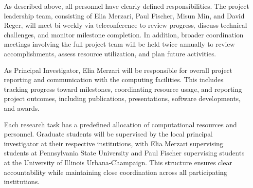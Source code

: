 \documentclass[11pt,letterpaper,english]{article}
\begin{document}
\noindent As described above, all personnel have clearly defined responsibilities. The project leadership team, consisting of Elia Merzari, Paul Fischer, Misun Min, and David Reger, will meet bi-weekly via teleconference to review progress, discuss technical challenges, and monitor milestone completion. In addition, broader coordination meetings involving the full project team will be held twice annually to review accomplishments, assess resource utilization, and plan future activities.

\noindent As Principal Investigator, Elia Merzari will be responsible for overall project reporting and communication with the computing facilities. This includes tracking progress toward milestones, coordinating resource usage, and reporting project outcomes, including publications, presentations, software developments, and awards.

\noindent Each research task has a predefined allocation of computational resources and personnel. Graduate students will be supervised by the local principal investigator at their respective institutions, with Elia Merzari supervising students at Pennsylvania State University and Paul Fischer supervising students at the University of Illinois Urbana-Champaign. This structure ensures clear accountability while maintaining close coordination across all participating institutions.
\end{document}
